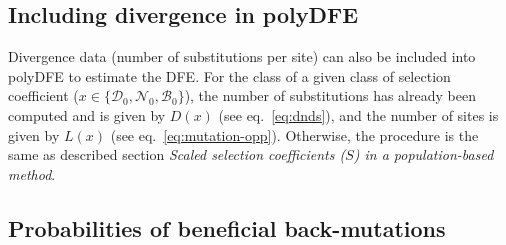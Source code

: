 \documentclass[12pt]{article}
\newcommand{\SphyDel}{\mathcal{D}_0}
\newcommand{\SphyNeu}{\mathcal{N}_0}
\newcommand{\SphyBen}{\mathcal{B}_0}
\newcommand{\Sphyclass}{x}
\newcommand{\Spop}{S}
\begin{document}
    \subsection{Including divergence in polyDFE}
    Divergence data (number of substitutions per site) can also be included into polyDFE to estimate the DFE.
    For the class of a given class of selection coefficient ($\Sphyclass \in \{\SphyDel, \SphyNeu, \SphyBen \}$), the number of substitutions has already been computed and is given by $D\left( \Sphyclass \right)$ (see eq.~\ref{eq:dnds}), and the number of sites is given by $L \left( \Sphyclass \right)$ (see eq.~\ref{eq:mutation-opp}).
    Otherwise, the procedure is the same as described section \textit{Scaled selection coefficients ($\Spop$) in a population-based method}.

    \subsection{Probabilities of beneficial back-mutations}
\end{document}
